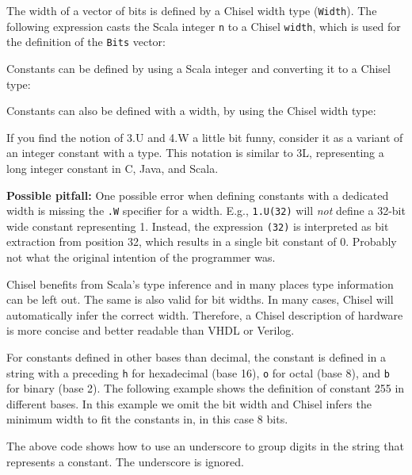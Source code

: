 \documentclass[%
    10pt,
    headinclude, footexclude,
    openright, %
    notitlepage,
    cleardoubleempty,
    headsepline,
    pointlessnumbers,
    bibtotoc, idxtotoc,
    ]{scrbook}
\newcommand{\code}[1]{{\small{\texttt{#1}}}}
\begin{document}

\noindent The width of a vector of bits is defined by a Chisel width type (\code{Width}).
The following expression casts the Scala integer \code{n} to a Chisel \code{width},
which is used for the definition of the \code{Bits} vector:




\noindent Constants can be defined by using a Scala integer and converting it to a Chisel type:


\noindent Constants can also be defined with a width, by using the Chisel width type:


\noindent If you find the notion of 3.U and 4.W a little bit funny, consider it as a variant of an integer
constant with a type. This notation is similar to 3L, representing a long integer constant in C, Java, and Scala.

{\bf Possible pitfall:} One possible error when defining constants with a dedicated width is missing the \code{.W}
specifier for a width. E.g., \code{1.U(32)} will \emph{not} define a 32-bit wide constant representing 1.
Instead, the expression \code{(32)} is interpreted as bit extraction from position 32, which results
in a single bit constant of 0. Probably not what the original intention of the programmer was.


Chisel benefits from Scala's type inference and in many places type information can be left out.
The same is also valid for bit widths. In many cases, Chisel will automatically infer the correct width.
Therefore, a Chisel description of hardware is more concise and better readable than VHDL or
Verilog.

For constants defined in other bases than decimal, the constant is defined in a string with
a preceding \code{h} for hexadecimal (base 16), \code{o} for octal (base 8), and \code{b}
for binary (base 2). The following example shows the definition of constant 255 in different
bases. In this example we omit the bit width and Chisel infers the minimum width to fit
the constants in, in this case 8 bits.


\noindent The above code shows how to use an underscore to group digits in the
string that represents a constant. The underscore is ignored.
\end{document}
